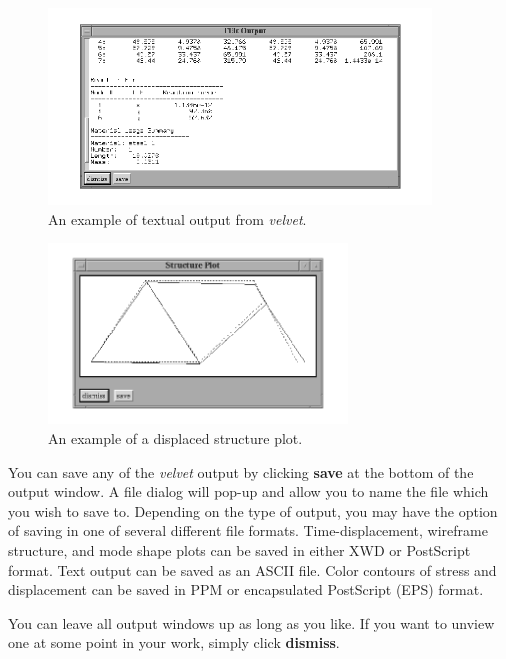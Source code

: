\begin{figure}
\begin{center}
 \includegraphics[width=4.0in]{figures/velvet_ascii}
\end{center}
\caption{An example of textual output from {\em velvet}.}
\label{velvet.ascii}
\end{figure}

\begin{figure}
\begin{center}
 \includegraphics[width=3.13in]{figures/velvet_structure}
\end{center}
\caption{An example of a displaced structure plot.}
\label{velvet.structure}
\end{figure}

You can save any of the {\em velvet} output by clicking {\bf save} at the 
bottom of the output window.  A file dialog will 
pop-up and allow you to name the file which you wish to save to.  
Depending on the type of output, you may have the option of saving in
one of several different file formats.  Time-displacement, wireframe
structure, and mode shape plots can be saved in either XWD or PostScript 
format.  Text output can be saved as an ASCII file.  Color contours of stress 
and displacement can be saved in PPM or encapsulated PostScript (EPS) format.  

You can leave all output windows up as long as you like.  If you want to 
unview one at some point in your work, simply click {\bf dismiss}.  

